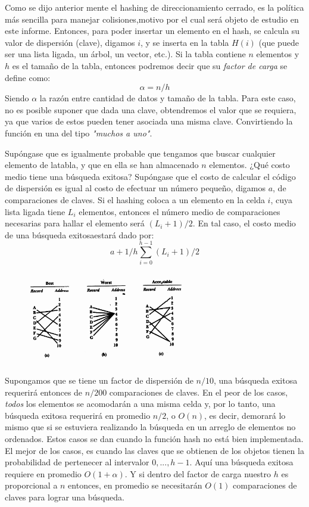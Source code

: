 \documentclass[letterpaper,openright,12pt]{report}
\begin{document}
Como se dijo anterior mente el hashing de direccionamiento cerrado, es la política más sencilla para manejar colisiones,motivo por el cual será objeto de estudio en este informe.
Entonces, para poder insertar un elemento en el hash, se calcula su valor de dispersión (clave), digamos $i$, y se inserta en la tabla $H(i)$ (que puede ser una lista ligada, un árbol, un vector, etc.). Si la tabla contiene $n$ elementos y $h$ es el tamaño de la tabla, entonces podremos decir que su \emph{factor de carga} se define como: \begin{equation}
\alpha = n/h
\end{equation} Siendo $\alpha$ la razón entre cantidad de datos y tamaño de la tabla.
Para este caso, no es posible suponer que dada una clave, obtendremos el valor que se requiera, ya que varios de estos pueden tener asociada una misma clave. Convirtiendo la función en una del tipo \emph{"muchos a uno"}.

Supóngase que es igualmente probable que tengamos que buscar cualquier elemento de latabla, y que en ella se han almacenado $n$ elementos. ¿Qué costo medio tiene una búsqueda exitosa? Supóngase que el costo de calcular el código de dispersión es igual al costo de efectuar un número pequeño, digamos $a$, de comparaciones de claves. Si el hashing coloca a un elemento en la celda $i$, cuya lista ligada tiene $L_i$ elementos, entonces el número medio de comparaciones necesarias para hallar el elemento será $(L_i + 1)/2$. En tal caso, el costo medio de una búsqueda exitosaestará dado por:
\begin{equation}
a + 1/h \sum_{i=0}^{h-1}(L_i + 1)/2
\end{equation}
\newpage
\begin{center}
\begin{figure}[h]
\includegraphics[width=265px,height=152px]{./.imagen/colision_case.png}
\end{figure}
\end{center}
Supongamos que se tiene un factor de dispersión de $n/10$, una búsqueda exitosa requerirá entonces de $n/200$ comparaciones de claves. En el peor de los casos, \emph{todos} los elementos se acomodarán a una misma celda y, por lo tanto, una búsqueda exitosa requerirá en promedio $n/2$, o $O(n)$, es decir, demorará lo mismo que si se estuviera realizando la búsqueda en un arreglo de elementos no ordenados. Estos casos se dan cuando la función hash no está bien implementada.
El mejor de los casos, es cuando las claves que se obtienen de los objetos tienen la probabilidad de pertenecer al intervalor $0, ..., h - 1$. Aquí una búsqueda exitosa requiere en promedio $O(1 + \alpha)$. Y si dentro del factor de carga nuestro $h$ es proporcional a $n$ entonces, en promedio se necesitarán $O(1)$ comparaciones de claves para lograr una búsqueda.
\end{document}
